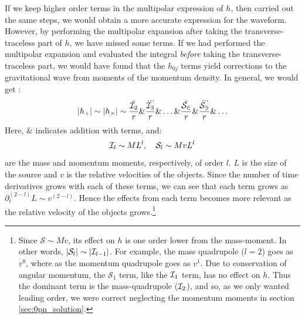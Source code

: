 If we keep higher order terms in the multipolar expression of $h$, then carried out the same steps, we would obtain a more accurate expression for the waveform. However, by performing the multipolar expansion after taking the transverse-traceless part of $h$, we have missed some terms. If we had performed the multipolar expansion and evaluated the integral \emph{before} taking the transverse-traceless part, we would have found that the $h_{0j}$ terms yield corrections to the gravitational wave from moments of the momentum density. In general, we would get \cite{BlanfordThorne}:
\begin{equation}
|h_{+}| \sim |h_{\times}| \sim \frac{\ddot{\mathcal{I}_2}}{r} \& \frac{\dddot{\mathcal{I}_3}}{r} \& \ldots \& \frac{\ddot{\mathcal{S_2}}}{r} \& \frac{\dddot{\mathcal{S_3}}}{r} \& \ldots
\end{equation}
Here, $\&$ indicates addition with terms, and:
\begin{equation}
\mathcal{I}_l \sim ML^l, \quad \mathcal{S}_l \sim MvL^l
\end{equation}
are the mass and momentum moments, respectively, of order $l$. $L$ is the size of the source and $v$ is the relative velocities of the objects. Since the number of time derivatives grows with each of these terms, we can see that each term grows as $\partial_t^{(2-l)} L \sim v^{(2-l)}$. Hence the effects from each term becomes more relevant as the relative velocity of the objects grows.\footnote{Since $\mathcal{S} \sim Mv$, its effect on $h$ is one order lower from the mass-moment. In other words, $|\mathcal{S}_l| \sim |\mathcal{I}_{l-1}|$. For example, the mass quadrupole ($l=2$) goes as $v^0$, where as the momentum quadrupole goes as $v^1$. Due to conservation of angular momentum, the $\mathcal{S}_1$ term, like the $\mathcal{I}_1$ term, has no effect on $h$. Thus the dominant term is the mass-quadrupole ($\mathcal{I}_2$), and so, as we only wanted leading order, we were correct neglecting the momentum moments in section \ref{sec:0pn_solution}.}

